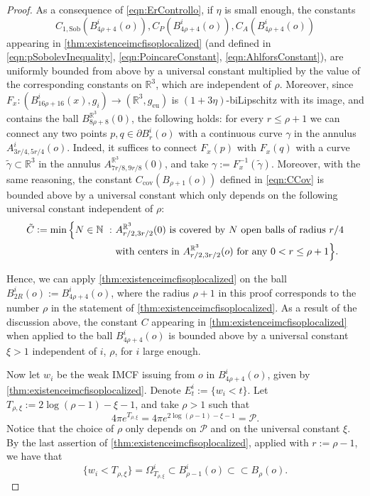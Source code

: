 \documentclass[a4paper,12pt,reqno]{amsart}
\numberwithin{equation}{section}
\theoremstyle{plain}
\theoremstyle{definition}
\theoremstyle{remark}
\newcommand{\st}{\ensuremath{\ :\ }} %
\newcommand{\eqdef}{\ensuremath{\vcentcolon=}}
\begin{document}
{\begin{proof}
As a consequence of \eqref{eqn:ErControllo}, if $\eta$ is small enough, the constants 
\[
C_{1,\mathrm{Sob}}(B^i_{4\rho+4}(o)),C_P(B^i_{4\rho+4}(o)),C_A(B^i_{4\rho+4}(o))
\]
appearing in \cref{thm:existenceimcfisoplocalized} (and defined in \eqref{eqn:pSobolevInequality}, \eqref{eqn:PoincareConstant}, \eqref{eqn:AhlforsConstant}), are uniformly bounded from above by a universal constant multiplied by the value of the corresponding constants on $\mathbb R^3$, which are independent of $\rho$. Moreover, since $F_x:(B^i_{16\rho+16}(x),g_i)\to (\mathbb R^3,g_{\mathrm{eu}})$ is $(1+3\eta)$-biLipschitz with its image, and contains the ball $B_{8\rho+8}^{\mathbb R^3}(0)$, the following holds: for every $r\leq \rho+1$ we can connect any two points $p,q\in \partial B^i_r(o)$ with a continuous curve $\gamma$ in the annulus $A^i_{3r/4, 5r/4}(o)$. Indeed, it suffices to connect $F_x(p)$ with $F_x(q)$ with a curve $\tilde\gamma\subset \mathbb R^3$ in the annulus $A^{\mathbb R^3}_{7r/8,9r/8}(0)$, and take $\gamma:=F_x^{-1}(\tilde\gamma)$. Moreover, with the same reasoning, the constant $C_{\mathrm{cov}}(B_{\rho+1}(o))$ defined in \eqref{eqn:CCov} is bounded above by a universal constant which only depends on the following universal constant independent of $\rho$:
\begin{equation}\label{eqn:CCovNuova}
\begin{split}
\tilde{C}\eqdef \min\Big\{N\in\mathbb N \st 
&\text{$A^{\mathbb R^3}_{r/2,3r/2}(0)$ is covered by $N$ open balls of radius $r/4$} \\
&\text{with centers in $A^{\mathbb R^3}_{r/2,3r/2}(o)$ for any $0<r\leq \rho+1$} \Big\}.
\end{split}
\end{equation}

Hence, we can apply \cref{thm:existenceimcfisoplocalized} on the ball $B^i_{2R}(o):=B^i_{4\rho+4}(o)$, where the radius $\rho+1$ in this proof corresponds to the number $\rho$ in the statement of \cref{thm:existenceimcfisoplocalized}. As a result of the discussion above, the constant $C$ appearing in \cref{thm:existenceimcfisoplocalized} when applied to the ball $B^i_{4\rho+4}(o)$ is bounded above by a universal constant $\xi>1$ independent of $i$, $\rho$, for $i$ large enough.

Now let $w_i$ be the weak IMCF issuing from $o$ in $B^i_{4\rho+4}(o)$, given by \cref{thm:existenceimcfisoplocalized}. Denote $E_t^i:=\{w_i< t\}$. Let $T_{\rho,\xi}:=2\log(\rho-1)-\xi-1$, and take $\rho>1$ such that
\begin{equation}\label{eqn:SceltaRho}
    4\pi e^{T_{\rho,\xi}}=4\pi e^{2\log(\rho-1)-\xi-1}=\mathscr{P}.
    \end{equation} 
    Notice that the choice of $\rho$ only depends on $\mathscr{P}$ and on the universal constant $\xi$.
    By the last assertion of \cref{thm:existenceimcfisoplocalized}, applied with $r:=\rho-1$, we have that 
\[
\{w_i< T_{\rho,\xi}\}=\Omega_{T_{\rho,\xi}}^i\subset B_{\rho-1}^i(o)\subset\subset B_\rho(o).
\]


\end{proof}}
\end{document}
